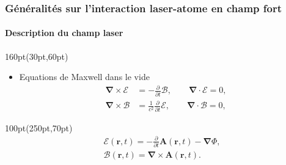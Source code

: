 \begin{frame}
\frametitle{G\'en\'eralit\'es sur l'interaction laser-atome en champ fort}
\framesubtitle{Description du champ laser}

%



\begin{textblock*}{160pt}(30pt,60pt)
\begin{itemize}
\footnotesize
\item Equations de Maxwell dans le vide
\begin{equation*}
 \begin{split}
 \boldsymbol{\nabla} \times \boldsymbol{\mathcal{E}}
  & = -\frac{\partial}{\partial t}\boldsymbol{\mathcal{B}}, \qquad
     \boldsymbol{\nabla} \cdot \boldsymbol{\mathcal{E}}  = 0, \\
\boldsymbol{\nabla} \times \boldsymbol{\mathcal{B}}
  & =  \frac{1}{c^2}\frac{\partial}{\partial t} \boldsymbol{\mathcal E},\qquad
     \boldsymbol{\nabla} \cdot \boldsymbol{\mathcal{B}}  = 0,
\end{split}
\end{equation*}
\end{itemize}

\end{textblock*}



\begin{textblock*}{100pt}(250pt,70pt)
\footnotesize
\begin{equation*}
 \begin{split}
& \boldsymbol{\mathcal{E}} (\boldsymbol{r},t)
    = - \frac{\partial}{\partial t}\boldsymbol{A}(\boldsymbol{r},t)
      - \boldsymbol{\nabla}\Phi, \\
&  \boldsymbol{\mathcal{B}}  (\boldsymbol{r},t)
    = \boldsymbol{\nabla} \times \boldsymbol{A}(\boldsymbol{r},t).
      \label{eqn:field_pot_link}
\end{split}
\end{equation*}


\end{textblock*}
\end{frame}
